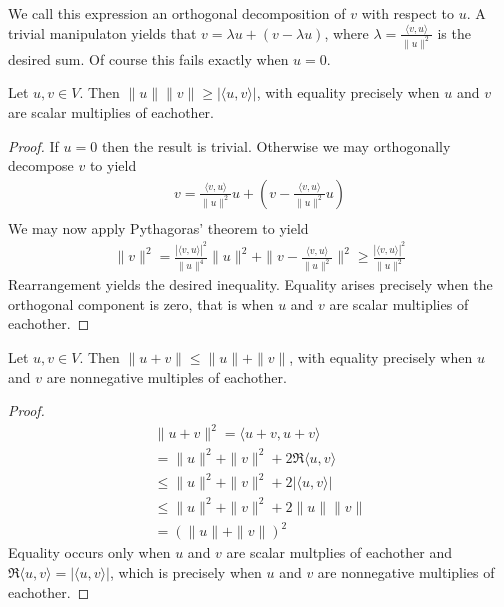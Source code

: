 \documentclass[]{article}
\begin{document}
We call this expression an orthogonal decomposition of $v$ with respect to $u$. A trivial manipulaton yields that $v = \lambda u + (v - \lambda u)$, where $\lambda = \frac{\langle v, u \rangle }{\|u\|^2}$ is the desired sum. Of course this fails exactly when $u = 0$.

\begin{thm} 

	Let $u,v \in V$. Then $\|u\|\|v\| \geq |\langle u, v \rangle |$, with equality precisely when $u$ and $v$ are scalar multiplies of eachother.
		
\end{thm}

\begin{proof}
		If $u = 0$ then the result is trivial. Otherwise we may orthogonally decompose $v$ to yield
		\begin{align*}
				v = \frac{\langle v, u \rangle }{\|u\|^2} u + (v - \frac{\langle v, u \rangle }{\|u\|^2}u) \\
		\end{align*}
		We may now apply Pythagoras' theorem to yield
		\begin{align*}
				\|v\|^2 = \frac{|\langle v, u \rangle |^2}{\|u\|^{4}} \|u\|^2 + \|v - \frac{\langle v, u \rangle }{\|u\|^2}\|^2
				\geq \frac{|\langle v, u \rangle |^2}{\|u\|^2}
		\end{align*}
		Rearrangement yields the desired inequality. Equality arises precisely when the orthogonal component is zero, that is when $u$ and $v$ are scalar multiplies of eachother.
\end{proof}

\begin{thm} 
	Let $u,v \in V$. Then $\|u+v\| \leq \|u\| + \|v\|$, with equality precisely when $u$ and $v$ are nonnegative multiples of eachother.	
\end{thm}

\begin{proof}
	 \begin{align*}
			\|u+v\|^2 = \langle u+v, u+v \rangle \\
			= \|u\|^2 + \|v\|^2 + 2\Re \langle u, v \rangle  \\
			\leq \|u\|^2 + \|v\|^2 + 2|\langle u, v \rangle | \\
			\leq \|u\|^2 + \|v\|^2 + 2\|u\|\|v\| \\
			= (\|u\| + \|v\|)^2
	\end{align*}	
	Equality occurs only when $u$ and $v$ are scalar multplies of eachother and $\Re \langle u, v \rangle = |\langle u, v \rangle |$, which is precisely when $u $ and $v$ are nonnegative multiplies of eachother.
\end{proof}
\end{document}
